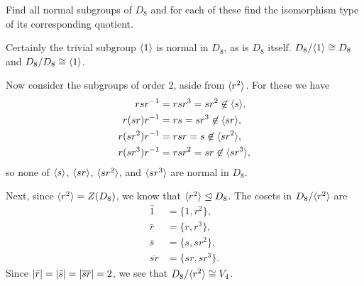  Find all normal subgroups of $D_8$ and for each of these
find the isomorphism type of its corresponding quotient.
\begin{solution}
  Certainly the trivial subgroup $\langle{1}\rangle$ is normal in $D_8$, as is
  $D_8$ itself. $D_8/\langle{1}\rangle\cong D_8$ and $D_8/D_8\cong\langle{1}\rangle$.

  Now consider the subgroups of order $2$, aside from $\langle{r^2}\rangle$. For
  these we have
  \begin{align*}
    rsr^{-1} &= rsr^3 = sr^2\not\in\langle{s}\rangle, \\
    r(sr)r^{-1} &= rs = sr^3 \not\in\langle{sr}\rangle, \\
    r(sr^2)r^{-1} &= rsr = s \not\in\langle{sr^2}\rangle, \\
    r(sr^3)r^{-1} &= rsr^2 = sr \not\in\langle{sr^3}\rangle,
  \end{align*}
  so none of $\langle{s}\rangle$, $\langle{sr}\rangle$, $\langle{sr^2}\rangle$, and $\langle{sr^3}\rangle$ are
  normal in $D_8$.

  Next, since $\langle{r^2}\rangle = Z(D_8)$, we know that
  $\langle{r^2}\rangle\trianglelefteq D_8$. The cosets in $D_8/\langle{r^2}\rangle$ are
  \begin{align*}
    \bar1 &= \{1, r^2\}, \\
    \bar{r} &= \{r, r^3\}, \\
    \bar{s} &= \{s, sr^2\}, \\
    \overline{sr} &= \{sr, sr^3\}.
  \end{align*}
  Since $\lvert{\bar{r}}\rvert = \lvert{\bar{s}}\rvert = \lvert{\overline{sr}}\rvert = 2$, we
  see that $D_8/\langle{r^2}\rangle\cong V_4$.


\end{solution}

